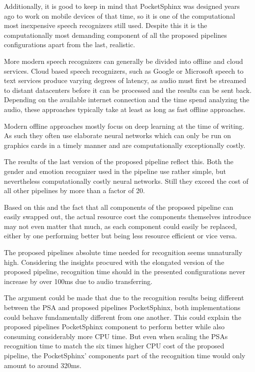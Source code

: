 Additionally, it is good to keep in mind that PocketSphinx was designed years ago to work on mobile devices of that time, so it is one of the computational most inexpensive speech recognizers still used. 
Despite this it is the computationally most demanding component of all the proposed pipelines configurations apart from the last, realistic.

More modern speech recognizers can generally be divided into offline and cloud services.
Cloud based speech recognizers, such as Google or Microsoft speech to text services produce varying degrees of latency, as audio must first be streamed to distant datacenters before it can be processed and the results can be sent back.
Depending on the available internet connection and the time spend analyzing the audio, these approaches typically take at least as long as fast offline approaches.

Modern offline approaches mostly focus on deep learning at the time of writing. 
As such they often use elaborate neural networks which can only be run on graphics cards in a timely manner and are computationally exceptionally costly.

The results of the last version of the proposed pipeline reflect this.
Both the gender and emotion recognizer used in the pipeline use rather simple, but nevertheless computationally costly neural networks.
Still they exceed the cost of all other pipelines by more than a factor of 20.

Based on this and the fact that all components of the proposed pipeline can easily swapped out, the actual resource cost the components themselves introduce may not even matter that much, as each component could easily be replaced, either by one performing better but being less resource efficient or vice versa.

The proposed pipelines absolute time needed for recognition seems unnaturally high.
Considering the insights procured with the elongated version of the proposed pipeline, recognition time should in the presented configurations never increase by over 100ms due to audio transferring.

The argument could be made that due to the recognition results being different between the PSA and proposed pipelines PocketSphinx, both implementations could behave fundamentally different from one another.
This could explain the proposed pipelines PocketSphinx component to perform better while also consuming considerably more CPU time.
But even when scaling the PSAs recognition time to match the six times higher CPU cost of the proposed pipeline, the PocketSphinx' components part of the recognition time would only amount to around 320ms.

